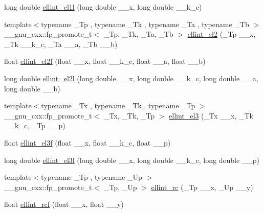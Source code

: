 \begin{DoxyCompactItemize}
\item 
long double \hyperlink{group__mathsf__gnu_gaeed1201e421be410460739048cba5cd8}{ellint\+\_\+el1l} (long double \+\_\+\+\_\+x, long double \+\_\+\+\_\+k\+\_\+c)
\item 
{\footnotesize template$<$typename \+\_\+\+Tp , typename \+\_\+\+Tk , typename \+\_\+\+Ta , typename \+\_\+\+Tb $>$ }\\\+\_\+\+\_\+gnu\+\_\+cxx\+::fp\+\_\+promote\+\_\+t$<$ \+\_\+\+Tp, \+\_\+\+Tk, \+\_\+\+Ta, \+\_\+\+Tb $>$ \hyperlink{group__mathsf__gnu_ga6230131ce5679e0936a16a6b029d6342}{ellint\+\_\+el2} (\+\_\+\+Tp \+\_\+\+\_\+x, \+\_\+\+Tk \+\_\+\+\_\+k\+\_\+c, \+\_\+\+Ta \+\_\+\+\_\+a, \+\_\+\+Tb \+\_\+\+\_\+b)
\item 
float \hyperlink{group__mathsf__gnu_ga0bf7469fe7ac92e9a2ffa0f92ea62248}{ellint\+\_\+el2f} (float \+\_\+\+\_\+x, float \+\_\+\+\_\+k\+\_\+c, float \+\_\+\+\_\+a, float \+\_\+\+\_\+b)
\item 
long double \hyperlink{group__mathsf__gnu_ga491439a09e6000659444f52dc3c9f215}{ellint\+\_\+el2l} (long double \+\_\+\+\_\+x, long double \+\_\+\+\_\+k\+\_\+c, long double \+\_\+\+\_\+a, long double \+\_\+\+\_\+b)
\item 
{\footnotesize template$<$typename \+\_\+\+Tx , typename \+\_\+\+Tk , typename \+\_\+\+Tp $>$ }\\\+\_\+\+\_\+gnu\+\_\+cxx\+::fp\+\_\+promote\+\_\+t$<$ \+\_\+\+Tx, \+\_\+\+Tk, \+\_\+\+Tp $>$ \hyperlink{group__mathsf__gnu_gaac07922e08fdf46cd509ff0cfa9ea1f0}{ellint\+\_\+el3} (\+\_\+\+Tx \+\_\+\+\_\+x, \+\_\+\+Tk \+\_\+\+\_\+k\+\_\+c, \+\_\+\+Tp \+\_\+\+\_\+p)
\item 
float \hyperlink{group__mathsf__gnu_ga66131a8ecc14b5228a73a01121f60a35}{ellint\+\_\+el3f} (float \+\_\+\+\_\+x, float \+\_\+\+\_\+k\+\_\+c, float \+\_\+\+\_\+p)
\item 
long double \hyperlink{group__mathsf__gnu_ga0d90e66f799a2ebe4bec43eef0d53355}{ellint\+\_\+el3l} (long double \+\_\+\+\_\+x, long double \+\_\+\+\_\+k\+\_\+c, long double \+\_\+\+\_\+p)
\item 
{\footnotesize template$<$typename \+\_\+\+Tp , typename \+\_\+\+Up $>$ }\\\+\_\+\+\_\+gnu\+\_\+cxx\+::fp\+\_\+promote\+\_\+t$<$ \+\_\+\+Tp, \+\_\+\+Up $>$ \hyperlink{group__mathsf__gnu_ga7d3d42f5f71a74266be8aaca528056bf}{ellint\+\_\+rc} (\+\_\+\+Tp \+\_\+\+\_\+x, \+\_\+\+Up \+\_\+\+\_\+y)
\item 
float \hyperlink{group__mathsf__gnu_gaad5316092224ec3d92b66e79ef266adf}{ellint\+\_\+rcf} (float \+\_\+\+\_\+x, float \+\_\+\+\_\+y)

\end{DoxyCompactItemize}
